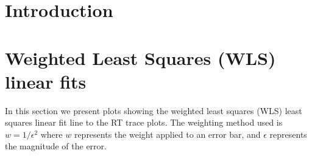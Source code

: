 \section{Introduction}


\section{Weighted Least Squares (WLS) linear fits}

In this section we present plots showing the weighted least squares (WLS) least squares linear fit line to the RT trace plots. The weighting method used is $w = 1/\epsilon^2$ where $w$ represents the weight applied to an error bar, and $\epsilon$ represents the magnitude of the error.

